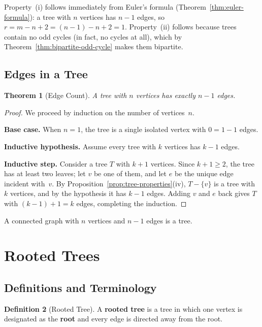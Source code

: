 \documentclass[11pt, a4paper, notitlepage]{report}
\newtheorem{theorem}{Theorem}[section]
\theoremstyle{definition}
\newtheorem{definition}[theorem]{Definition}
\theoremstyle{remark}
\begin{document}
Property~(i) follows immediately from Euler's formula (Theorem~\ref{thm:euler-formula}): a tree with $n$ vertices has $n-1$ edges, so $r = m - n + 2 = (n-1) - n + 2 = 1$. Property~(ii) follows because trees contain no odd cycles (in fact, no cycles at all), which by Theorem~\ref{thm:bipartite-odd-cycle} makes them bipartite.

\subsection{Edges in a Tree}
\label{subsec:tree-edges}

\begin{theorem}[Edge Count]
\label{thm:tree-edges}
A tree with $n$ vertices has exactly $n - 1$ edges.
\end{theorem}

\begin{proof}
We proceed by induction on the number of vertices~$n$.

\textbf{Base case.} When $n = 1$, the tree is a single isolated vertex with $0 = 1 - 1$ edges.

\textbf{Inductive hypothesis.} Assume every tree with $k$ vertices has $k - 1$ edges.

\textbf{Inductive step.} Consider a tree $T$ with $k + 1$ vertices. Since $k + 1 \geq 2$, the tree has at least two leaves; let $v$ be one of them, and let $e$ be the unique edge incident with~$v$. By Proposition~\ref{prop:tree-properties}(iv), $T - \{v\}$ is a tree with $k$ vertices, and by the hypothesis it has $k - 1$ edges. Adding $v$ and $e$ back gives $T$ with $(k - 1) + 1 = k$ edges, completing the induction.
\end{proof}

\begin{keyresult}[title={Alternative Definition of a Tree}]
A connected graph with $n$ vertices and $n - 1$ edges is a tree.
\end{keyresult}

\section{Rooted Trees}
\label{sec:rooted-trees}

\subsection{Definitions and Terminology}
\label{subsec:rooted-tree-def}

\begin{definition}[Rooted Tree]
\label{def:rooted-tree}
A \textbf{rooted tree} is a tree in which one vertex is designated as the \textbf{root} and every edge is directed away from the root.
\end{definition}
\end{document}
